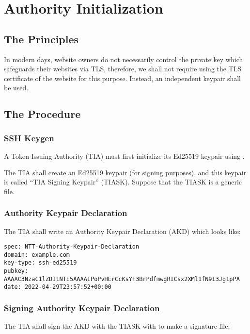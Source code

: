 \section{Authority Initialization}


\subsection{The Principles}

In modern days, website owners do not necessarily control the private key which safeguards their websites via TLS,
therefore, we shall not require using the TLS certificate of the website for this purpose.
Instead, an independent keypair shall be used.


\subsection{The Procedure}

\subsubsection{SSH Keygen}

A Token Issuing Authority (TIA) must first initialize its Ed25519 keypair using .

The TIA shall create an Ed25519 keypair (for signing purposes), and this keypair is called ``TIA Signing Keypair'' (TIASK).
Suppose that the TIASK is a generic  file.

\subsubsection{Authority Keypair Declaration}

The TIA shall write an Authority Keypair Declaration (AKD) which looks like:

\begin{lstlisting}
spec: NTT-Authority-Keypair-Declaration
domain: example.com
key-type: ssh-ed25519
pubkey: AAAAC3NzaC1lZDI1NTE5AAAAIPoPvHErCcKsYF3BrPdfmwgRICsx2XMl1fN9I3Jg1pPA
date: 2022-04-29T23:57:52+00:00
\end{lstlisting}

\subsubsection{Signing Authority Keypair Declaration}

The TIA shall sign the AKD with the TIASK with  to make a signature file:

